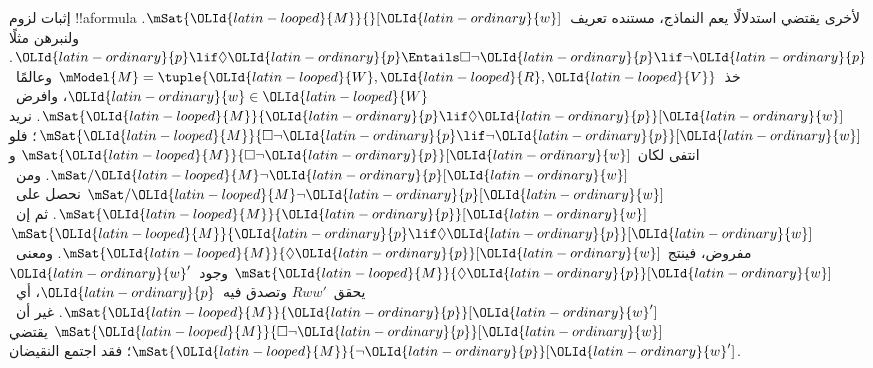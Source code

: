 \documentclass[../../../include/open-logic-section]{subfiles}
\begin{document}
\begin{ex}
  إثبات لزوم !!a{formula} لأخرى يقتضي استدلالًا يعم النماذج،
  مستنده تعريف~$\mSat{{\OLId{latin-looped}{M}}}{}[{\OLId{latin-ordinary}{w}}]$. ولنبرهن مثلًا
  ${\OLId{latin-ordinary}{p}} \lif \Diamond {\OLId{latin-ordinary}{p}} \Entails \Box\lnot {\OLId{latin-ordinary}{p}} \lif \lnot {\OLId{latin-ordinary}{p}}$.
  خذ~$\mModel{M} = \tuple{{\OLId{latin-looped}{W}}, {\OLId{latin-looped}{R}}, {\OLId{latin-looped}{V}}}$ وعالمًا~${\OLId{latin-ordinary}{w}} \in {\OLId{latin-looped}{W}}$،
  وافرض~$\mSat{{\OLId{latin-looped}{M}}}{{\OLId{latin-ordinary}{p}} \lif \Diamond {\OLId{latin-ordinary}{p}}}[{\OLId{latin-ordinary}{w}}]$. نريد
  $\mSat{{\OLId{latin-looped}{M}}}{\Box\lnot {\OLId{latin-ordinary}{p}} \lif \lnot {\OLId{latin-ordinary}{p}}}[{\OLId{latin-ordinary}{w}}]$؛ فلو انتفى لكان
  $\mSat{{\OLId{latin-looped}{M}}}{\Box\lnot {\OLId{latin-ordinary}{p}}}[{\OLId{latin-ordinary}{w}}]$ و$\mSat/{{\OLId{latin-looped}{M}}}{\lnot {\OLId{latin-ordinary}{p}}}[{\OLId{latin-ordinary}{w}}]$.
  ومن~$\mSat/{{\OLId{latin-looped}{M}}}{\lnot {\OLId{latin-ordinary}{p}}}[{\OLId{latin-ordinary}{w}}]$ نحصل على~$\mSat{{\OLId{latin-looped}{M}}}{{\OLId{latin-ordinary}{p}}}[{\OLId{latin-ordinary}{w}}]$.
  ثم إن~$\mSat{{\OLId{latin-looped}{M}}}{{\OLId{latin-ordinary}{p}} \lif \Diamond {\OLId{latin-ordinary}{p}}}[{\OLId{latin-ordinary}{w}}]$ مفروض، فينتج
  $\mSat{{\OLId{latin-looped}{M}}}{\Diamond {\OLId{latin-ordinary}{p}}}[{\OLId{latin-ordinary}{w}}]$. ومعنى~$\mSat{{\OLId{latin-looped}{M}}}{\Diamond {\OLId{latin-ordinary}{p}}}[{\OLId{latin-ordinary}{w}}]$
  وجود~${\OLId{latin-ordinary}{w}}'$ يحقق~$Rww'$ وتصدق فيه~${\OLId{latin-ordinary}{p}}$، أي~$\mSat{{\OLId{latin-looped}{M}}}{{\OLId{latin-ordinary}{p}}}[{\OLId{latin-ordinary}{w}}']$.
  غير أن~$\mSat{{\OLId{latin-looped}{M}}}{\Box \lnot {\OLId{latin-ordinary}{p}}}[{\OLId{latin-ordinary}{w}}]$ يقتضي
  $\mSat{{\OLId{latin-looped}{M}}}{\lnot {\OLId{latin-ordinary}{p}}}[{\OLId{latin-ordinary}{w}}']$؛ فقد اجتمع النقيضان.


\end{ex}
\end{document}
